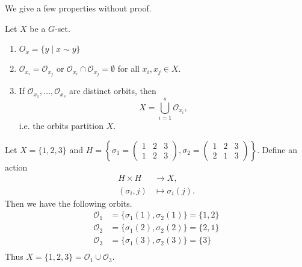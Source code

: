 We give a few properties without proof.

\begin{proposition}
	Let $X$ be a $G$-set.
	\begin{enumerate}
		\item $O_x=\{y\mid x\sim y\}$
		\item $\mathcal O_{x_i}=\mathcal O_{x_j}$ or $\mathcal O_{x_i}\cap\mathcal O_{x_j}=\emptyset$ for all $x_i,x_j\in X$.
		\item If $\mathcal O_{x_1},\hdots,\mathcal O_{x_s}$ are distinct orbits, then
		$$X=\bigcup_{i=1}^s\mathcal O_{x_i},$$
		i.e. the orbits partition $X$.
	\end{enumerate}
\end{proposition}

\begin{example}
	Let $X=\{1,2,3\}$ and $H=\left\{\sigma_1=\begin{pmatrix}
		1 & 2 & 3 \\ 1 & 2 & 3
	\end{pmatrix}, \sigma_2=\begin{pmatrix}
		1 & 2 & 3 \\ 2 & 1 & 3
	\end{pmatrix}\right\}$. Define an action
	\begin{align*}
		H\times H&\to X,\\
		(\sigma_i,j)&\mapsto \sigma_i(j).
	\end{align*}
	Then we have the following orbits.
	\begin{align*}
		\mathcal O_1&=\{\sigma_1(1),\sigma_2(1)\}=\{1,2\}\\
		\mathcal O_2&=\{\sigma_1(2),\sigma_2(2)\}=\{2,1\}\\
		\mathcal O_3&=\{\sigma_1(3),\sigma_2(3)\}=\{3\}\\
	\end{align*}
	Thus $X=\{1,2,3\}=\mathcal O_1\cup\mathcal O_3$.
\end{example}